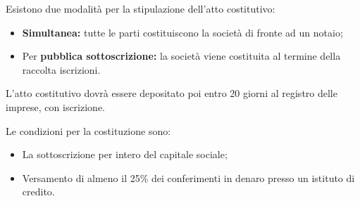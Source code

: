 \documentclass[a4paper,11pt]{article}
\begin{document}
Esistono due modalità per la stipulazione dell'atto costitutivo:
\begin{itemize}
	\item \textbf{Simultanea:} tutte le parti costituiscono la società di fronte ad un notaio;
	\item Per \textbf{pubblica sottoscrizione:} la società viene costituita al termine della raccolta iscrizioni.
\end{itemize}

L'atto costitutivo dovrà essere depositato poi entro 20 giorni al registro delle imprese, con iscrizione.

Le condizioni per la costituzione sono:
\begin{itemize}
	\item La sottoscrizione per intero del capitale sociale;
	\item Versamento di almeno il 25\% dei conferimenti in denaro presso un istituto di credito.
\end{itemize}
\end{document}
